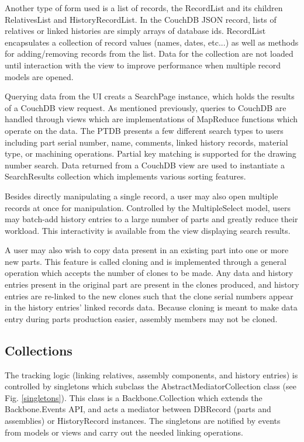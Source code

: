 \documentclass[journal]{IEEEtran}
\begin{document}
Another type of form used is a list of records, the RecordList and its children RelativesList and HistoryRecordList. 
In the CouchDB JSON record, lists of relatives or linked histories are simply arrays of database ids.
RecordList encapsulates a collection of record values (names, dates, etc...)
as well as methods for adding/removing records from the list. Data for the collection are not loaded
until interaction with the view to improve performance when multiple record models are opened.

Querying data from the UI creats a SearchPage instance, which holds the results of a CouchDB view request.
As mentioned previously, queries to CouchDB are handled through views which are implementations of
MapReduce functions which operate on the data. The PTDB presents a few different search types to users including
part serial number, name, comments, linked history records, material type, or machining operations.
Partial key matching is supported for the drawing number search.
Data returned from a CouchDB view are used to instantiate a SearchResults collection which implements various
sorting features. 

Besides directly manipulating a single record, a user may also open multiple records at once for 
manipulation. Controlled by the MultipleSelect model, users may batch-add history entries to a
large number of parts and greatly reduce their workload. This interactivity is available from
the view displaying search results.

A user may also wish to copy data present in an existing part into one or more new parts. This
feature is called cloning and is implemented through a general operation which accepts the number
of clones to be made. Any data and history entries present in the original part are present in the
clones produced, and history entries are re-linked to the new clones such that the clone serial
numbers appear in the history entries' linked records data. Because cloning is meant to make
data entry during parts production easier, assembly members may not be cloned. 

\subsection{Collections}
The tracking logic (linking relatives, assembly components, and history entries) is controlled
by singletons which subclass the AbstractMediatorCollection class (see Fig. \ref{singletons}). This class is a Backbone.Collection
which extends the Backbone.Events API, and acts a mediator between DBRecord (parts and assemblies) or
HistoryRecord instances. The singletons are notified by events from models or views and carry out the needed
linking operations.
\end{document}
